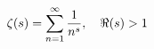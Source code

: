\documentclass[preview]{standalone}
\begin{document}
\begin{align*}
\special{dvisvgm:raw <g id='unique000'>}\zeta(s) = \sum_{n=1}^{\infty} \frac{1}{n^s}, \quad \Re(s) > 1\special{dvisvgm:raw </g>}
\end{align*}
\end{document}
